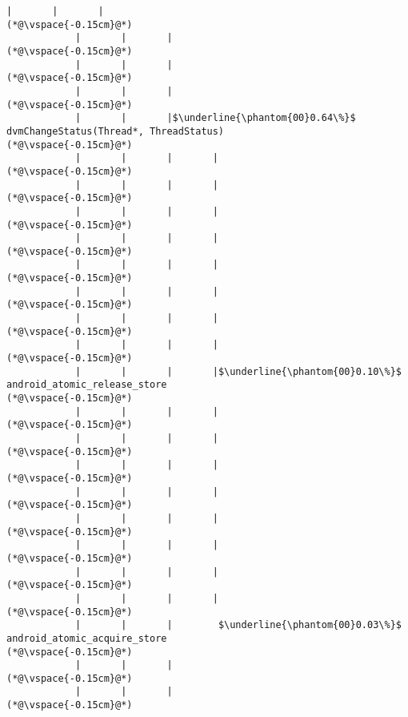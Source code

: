 \begin{lstlisting}[caption=20 viiteparametria Java$\to$C , label=profile:J2CBenchmark00206, numberbychapter=true, frame=lines, float, floatplacement=t]
            |       |       |
(*@\vspace{-0.15cm}@*)
            |       |       |
(*@\vspace{-0.15cm}@*)
            |       |       |
(*@\vspace{-0.15cm}@*)
            |       |       |
(*@\vspace{-0.15cm}@*)
            |       |       |$\underline{\phantom{00}0.64\%}$ dvmChangeStatus(Thread*, ThreadStatus)
(*@\vspace{-0.15cm}@*)
            |       |       |       |
(*@\vspace{-0.15cm}@*)
            |       |       |       |
(*@\vspace{-0.15cm}@*)
            |       |       |       |
(*@\vspace{-0.15cm}@*)
            |       |       |       |
(*@\vspace{-0.15cm}@*)
            |       |       |       |
(*@\vspace{-0.15cm}@*)
            |       |       |       |
(*@\vspace{-0.15cm}@*)
            |       |       |       |
(*@\vspace{-0.15cm}@*)
            |       |       |       |
(*@\vspace{-0.15cm}@*)
            |       |       |       |$\underline{\phantom{00}0.10\%}$ android_atomic_release_store
(*@\vspace{-0.15cm}@*)
            |       |       |       |
(*@\vspace{-0.15cm}@*)
            |       |       |       |
(*@\vspace{-0.15cm}@*)
            |       |       |       |
(*@\vspace{-0.15cm}@*)
            |       |       |       |
(*@\vspace{-0.15cm}@*)
            |       |       |       |
(*@\vspace{-0.15cm}@*)
            |       |       |       |
(*@\vspace{-0.15cm}@*)
            |       |       |       |
(*@\vspace{-0.15cm}@*)
            |       |       |       |
(*@\vspace{-0.15cm}@*)
            |       |       |        $\underline{\phantom{00}0.03\%}$ android_atomic_acquire_store
(*@\vspace{-0.15cm}@*)
            |       |       |
(*@\vspace{-0.15cm}@*)
            |       |       |
(*@\vspace{-0.15cm}@*)

\end{lstlisting}
